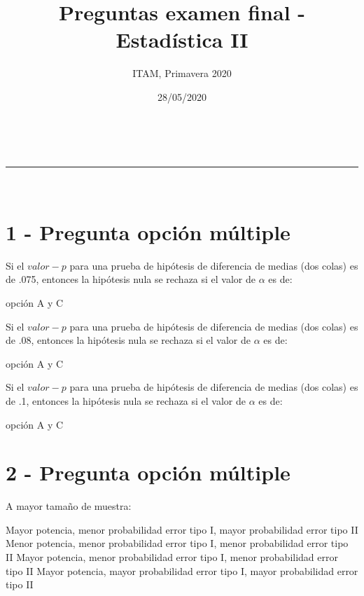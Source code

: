 \documentclass[addpoints]{exam}
\makeatletter
\newcommand{\linia}{\rule{\linewidth}{0.5pt}}
\theoremstyle{mytheor}
\renewcommand{\maketitle}{
    \begin{center}
    \vspace{2ex}
    {\huge \textsc{\@title}}
    \vspace{1ex}
    \\
    \linia\\
    \@author \hfill \@date
    \vspace{4ex}
    \end{center}
  }
\makeatother
\begin{document}
  
  \title{Preguntas examen final - Estadística II}
  
  \author{ITAM, Primavera 2020}
  
  \date{28/05/2020}
  
  \maketitle
  
  \section*{1 - Pregunta opción múltiple}
  
  \begin{questions}
  
  \question Si el $valor-p$ para una prueba de hipótesis de diferencia de medias (dos colas) es de .075, entonces la hipótesis nula se rechaza si el valor de $\alpha$ es de:
    
    \begin{checkboxes}
  \choice opción A y C
  \end{checkboxes}
  
  \question Si el $valor-p$ para una prueba de hipótesis de diferencia de medias (dos colas) es de .08, entonces la hipótesis nula se rechaza si el valor de $\alpha$ es de:
    
    \begin{checkboxes}
  \choice opción A y C
  \end{checkboxes}
  
  \question Si el $valor-p$ para una prueba de hipótesis de diferencia de medias (dos colas) es de .1, entonces la hipótesis nula se rechaza si el valor de $\alpha$ es de:
    
    \begin{checkboxes}
  \choice opción A y C
  \end{checkboxes}
  
  \newpage
  
  \section*{2 - Pregunta opción múltiple}
  
  \question A mayor tamaño de muestra:
    
    \begin{checkboxes}
  \choice Mayor potencia, menor probabilidad error tipo I, mayor probabilidad error tipo II
  \choice Menor potencia, menor probabilidad error tipo I, menor probabilidad error tipo II
  \choice Mayor potencia, menor probabilidad error tipo I, menor probabilidad error tipo II
  \choice Mayor potencia, mayor probabilidad error tipo I, mayor probabilidad error tipo II
  \end{checkboxes}
  

\end{questions}
\end{document}

